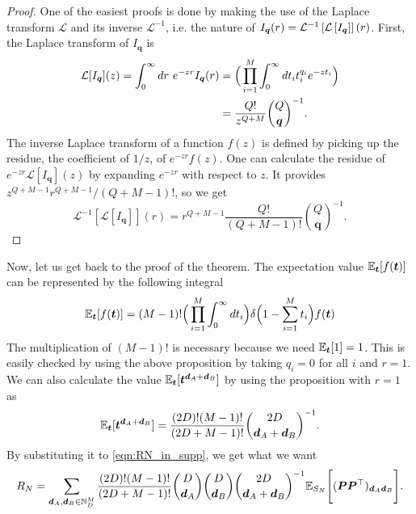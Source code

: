 \documentclass{article}
\begin{document}
%
\begin{proof}
One of the easiest proofs is done by making the use of the Laplace transform $\mathcal{L}$ and its inverse $\mathcal{L}^{-1}$, i.e. the nature of $I_{\bm q}(r) = \mathcal{L}^{-1} \left[\mathcal{L} \left[I_{\bm q} \right] \right] (r)$.
First, the Laplace transform of $I_{\bm q}$ is
\begin{align}
\mathcal{L} [ I_{\bm q} ] (z)
=
\int_0^\infty dr \ e^{-zr} I_{\bm q} (r)
&=
\Big(
\prod_{i=1}^M
\int_0^\infty
 dt_i t_i^{q_i}
 e^{-zt_i}
\Big)
\notag \\
&=
\frac{Q!}{z^{Q+M}}
\binom{Q}{\bm q}^{-1}.
\end{align}
The inverse Laplace transform of a function $f(z)$ is defined by picking up the residue, the coefficient of $1/z$, of $e^{-zr} f(z)$.
One can calculate the residue of $e^{-zr} \mathcal{L} [ I_{\bm q} ] (z)$ by expanding $e^{-zr}$ with respect to $z$.
It provides $z^{Q+M-1}r^{Q+M-1}/{(Q+M-1)!}$, so we get
\[
\mathcal{L}^{-1} [\mathcal{L} [ I_{\bm q} ]] (r)
=
r^{Q+M-1} \frac{Q!}{(Q+M-1)! } %
\binom{Q}{\bm q}^{-1}.
\]
\end{proof}
Now, let us get back to the proof of the theorem.
The expectation value $\mathbb{E}_{\bm t}[ f(\bm t) ]$ can be represented by the following integral 
\[
\mathbb{E}_{\bm t} [f(\bm t)]
=
(M-1)!
\Big(
\prod_{i=1}^M
\int_0^\infty
 dt_i 
\Big)
\delta \Big(
1 - \sum_{i=1}^M t_i
\Big)
f(\bm t)
\]
The multiplication of $(M-1)!$ is necessary because we need $\mathbb{E}_{\bm t}[1] = 1$.
This is easily checked by using the above proposition by taking $q_i =0$ for all $i$ and $r=1$.
We can also calculate the value $\mathbb{E}_{\bm t}[ \bm t^{\bm d_A + \bm d_B} ]$ by using the proposition with $r=1$ as
\[
\mathbb{E}_{\bm t}[ \bm t^{\bm d_A + \bm d_B} ]
=
\frac{(2D)!(M-1)!}{(2D + M -1)!}
\binom{2D}{\bm d_A + \bm d_B}^{-1}.
\]
By substituting it to \cref{eqn:RN_in_supp}, we get what we want
\begin{align}
R_N
=
\sum_{\bm d_A, \bm d_B \in \mathbb{N}_D^M}
\frac{(2D)!(M-1)!}{(2D + M -1)!}
\binom{D}{\bm d_A}
\binom{D}{\bm d_B}
\binom{2D}{\bm d_A + \bm d_B}^{-1}
\mathbb{E}_{S_N}
\Bigg[
(
\bm P \bm P^\top
)_{\bm d_A \bm d_B}
\Bigg].
\end{align}
\end{document}
